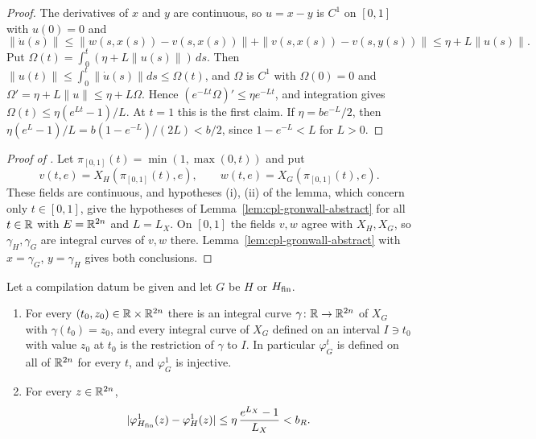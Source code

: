 \begin{proof}
The derivatives of $x$ and $y$ are continuous, so $u=x-y$ is $C^1$ on $[0,1]$ with $u(0)=0$ and
\[
 \|\dot u(s)\|\le\|w(s,x(s))-v(s,x(s))\|+\|v(s,x(s))-v(s,y(s))\|\le\eta+L\|u(s)\| .
\]
Put $\Omega(t)=\int_0^t(\eta+L\|u(s)\|)\,ds$. Then $\|u(t)\|\le\int_0^t\|\dot u(s)\|ds\le\Omega(t)$, and $\Omega$ is $C^1$
with $\Omega(0)=0$ and $\Omega'=\eta+L\|u\|\le\eta+L\Omega$. Hence $(e^{-Lt}\Omega)'\le\eta e^{-Lt}$, and integration
gives $\Omega(t)\le\eta(e^{Lt}-1)/L$. At $t=1$ this is the first claim. If $\eta=be^{-L}/2$, then
$\eta(e^L-1)/L=b(1-e^{-L})/(2L)<b/2$, since $1-e^{-L}<L$ for $L>0$.
\end{proof}

\begin{proof}[Proof of ]
Let $\pi_{[0,1]}(t)=\min(1,\max(0,t))$ and put
\[
 v(t,e)=X_H(\pi_{[0,1]}(t),e),\qquad w(t,e)=X_G(\pi_{[0,1]}(t),e).
\]
These fields
are continuous, and hypotheses (i), (ii) of the lemma, which concern only $t\in[0,1]$, give the hypotheses of
Lemma~\ref{lem:cpl-gronwall-abstract} for all $t\in\mathbb{R}$ with $E=\mathbb{R}^{2n}$ and $L=L_X$. On $[0,1]$ the fields $v,w$ agree
with $X_H,X_G$, so $\gamma_H,\gamma_G$ are integral curves of $v,w$ there. Lemma~\ref{lem:cpl-gronwall-abstract} with
$x=\gamma_G$, $y=\gamma_H$ gives both conclusions.
\end{proof}

\begin{lemma}\label{lem:cpl-gronwall}
Let a compilation datum be given and let $G$ be $H$ or $H_{\mathrm{fin}}$.
\begin{enumerate}[label=(\alph*)]
\item For every $(t_0,z_0)\in\mathbb{R}\times\mathbb{R}^{2n}$ there is an integral curve $\gamma\colon\mathbb{R}\to\mathbb{R}^{2n}$ of $X_G$ with
 $\gamma(t_0)=z_0$, and every integral curve of $X_G$ defined on an interval $I\ni t_0$ with value $z_0$ at $t_0$
 is the restriction of $\gamma$ to $I$. In particular $\varphi^t_G$ is defined on all of $\mathbb{R}^{2n}$ for every $t$, and
 $\varphi^1_G$ is injective.
\item For every $z\in\mathbb{R}^{2n}$,
\[
 |\varphi^1_{H_{\mathrm{fin}}}(z)-\varphi^1_H(z)|\le\eta\,\frac{e^{L_X}-1}{L_X}<b_R .
\]
\end{enumerate}
\end{lemma}

